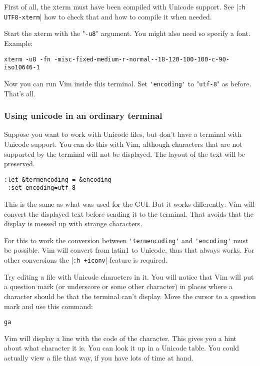 First of all, the xterm must have been compiled with Unicode support.
See |\verb!:h UTF8-xterm!| how to check that and how to compile it when needed.

Start the xterm with the "\verb!-u8!" argument.
You might also need so specify a font.
Example:

\begin{Verbatim}[samepage=true]
   xterm -u8 -fn -misc-fixed-medium-r-normal--18-120-100-100-c-90-iso10646-1
\end{Verbatim}

Now you can run Vim inside this terminal.
Set \verb!'encoding'! to "\verb!utf-8!" as before.
That's all.

\subsubsection{Using unicode in an ordinary terminal}
Suppose you want to work with Unicode files, but don't have a terminal with Unicode support.
You can do this with Vim, although characters that are not supported by the terminal will not be displayed.
The layout of the text will be preserved. 

\begin{Verbatim}[samepage=true]
 :let &termencoding = &encoding
 :set encoding=utf-8
\end{Verbatim}

This is the same as what was used for the GUI.
But it works differently: Vim will convert the displayed text before sending it to the terminal.
That avoids that the display is messed up with strange characters.

For this to work the conversion between \verb!'termencoding'! and \verb!'encoding'! must be possible.
Vim will convert from latin1 to Unicode, thus that always works.
For other conversions the |\verb!:h +iconv!| feature is required.

Try editing a file with Unicode characters in it.
You will notice that Vim will put a question mark (or underscore or some other character) in places where a character should be that the terminal can't display.
Move the cursor to a question mark and use this command:

\begin{Verbatim}[samepage=true]
 ga
\end{Verbatim}

Vim will display a line with the code of the character.
This gives you a hint about what character it is.
You can look it up in a Unicode table.
You could actually view a file that way, if you have lots of time at hand.

